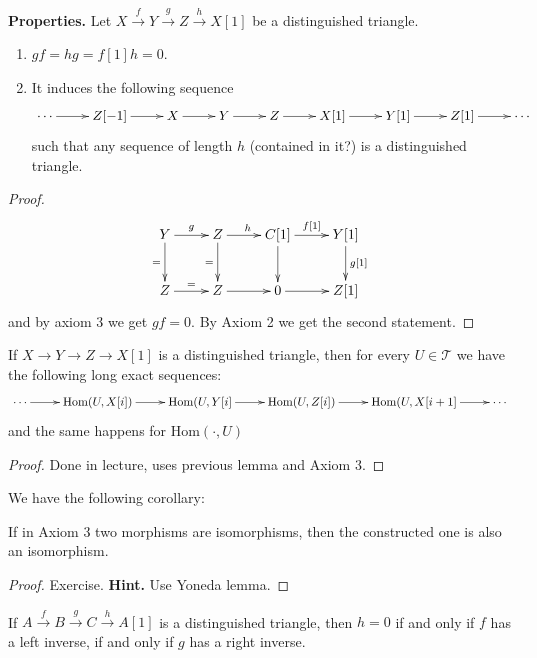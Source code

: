 {\bf Properties.} Let
$X\xrightarrow{f}Y\xrightarrow{g}
Z\xrightarrow{h}X[1]$
be a distinguished triangle.

\begin{lemma}
\label{dcos-label-011}
\begin{enumerate}
\item $gf=hg=f[1]h=0$.
\item It induces the following sequence
$$
\xymatrix{
\cdots\ar[r]&Z[-1]\ar[r]& X\ar[r]& Y\ar[r]&
Z\ar[r]&X[1]
\ar[r]&Y[1]\ar[r]& Z[1]\ar[r]&\cdots
}
$$
such that any sequence of length $h$
(contained in it?) is a distinguished
triangle.
\end{enumerate}
\end{lemma}

\begin{proof}
$$
\xymatrix{
Y\ar[r]^g\ar[d]_=& Z\ar[d]_=\ar[r]^h&
C[1]\ar[r]^{f[1]}\ar[d]&
Y[1]\ar[d]^{g[1]}\\
Z\ar[r]^{=}&Z\ar[r]& 0\ar[r]&Z[1]
}
$$
and by axiom 3 we get $gf=0$. By Axiom 2 we
get the second statement.
\end{proof}

\begin{lemma}
\label{dcos-label-012}
If $X \to Y \to Z \to X[1]$ is a
distinguished triangle, then for every $U \in
\mathcal{T}$ we have the following long exact
sequences:
$$
\xymatrix{
\cdots\ar[r]&\text{Hom}(U,X[i])\ar[r]&
\text{Hom}(U,Y[i]\ar[r]&
\text{Hom}(U,Z[i])\ar[r]&\text{Hom}(U,X[i+1]
\ar[r]&\cdots
}
$$
and the same happens for
$\text{Hom}(\cdot,U)$
\end{lemma}

\begin{proof}
Done in lecture, uses previous lemma and
Axiom 3.
\end{proof}

We have the following corollary:

\begin{corollary}
\label{dcos-label-013}
If in Axiom 3 two morphisms are isomorphisms,
then the constructed one is also an
isomorphism.
\end{corollary}

\begin{proof}
Exercise. {\bf Hint.} Use Yoneda lemma.
\end{proof}

\begin{exercise}
\label{dcos-label-014}
If
$A\xrightarrow{f}B\xrightarrow{g}
C\xrightarrow{h}A[1]$
is a distinguished triangle, then $h=0$ if
and only if $f$ has a left inverse, if and
only if $g$ has a right inverse.
\end{exercise}

